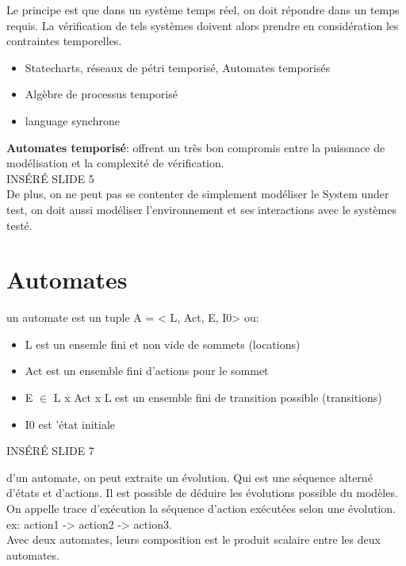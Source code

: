 \documentclass[oneside]{book}
\begin{document}
    Le principe est que dans un système temps réel, on doit répondre dans un temps requis. La vérification de tels systèmes doivent alors prendre en considération les contraintes temporelles.\\
    \begin{itemize}
        \item Statecharts, réseaux de pétri temporisé, Automates temporisés
        \item Algèbre de processus temporisé
        \item language synchrone
    \end{itemize}
    \textbf{Automates temporisé}: offrent un très bon compromis entre la puissnace de modélisation et la complexité de vérification.\\
    
    INSÉRÉ SLIDE 5\\
    
    De plus, on ne peut pas se contenter de simplement modéliser le System under test, on doit aussi modéliser l'environnement et ses interactions avec le systèmes testé.\\
    
    \section{Automates}
    un automate est un tuple A = < L, Act, E, I0> ou:
    \begin{itemize}
        \item L est un ensemle fini et non vide de sommets (locations)
        \item Act est un ensemble fini d'actions pour le sommet
        \item E $\in$ L x Act x L est un ensemble fini de transition possible (transitions)
        \item I0 est 'état initiale
    \end{itemize}

    INSÉRÉ SLIDE 7
    
    d'un automate, on peut extraite un évolution. Qui est une séquence alterné d'états et d'actions. Il est possible de déduire les évolutions possible du modèles. On appelle trace d'exécution la séquence d'action exécutées selon une évolution. ex: action1 -> action2 -> action3.\\
    
    Avec deux automates, leurs composition est le produit scalaire entre les deux automates.\\
    
\end{document}
